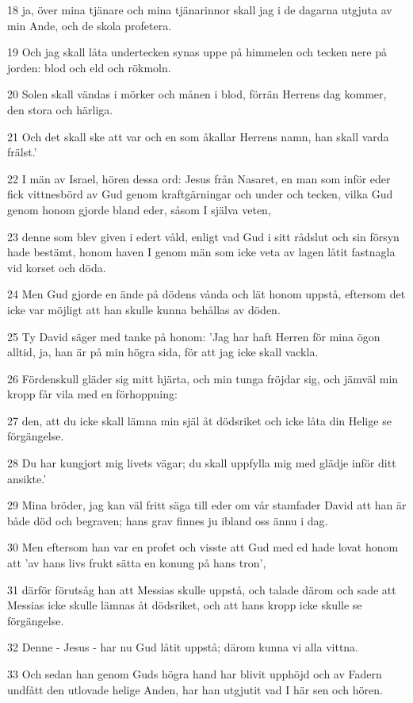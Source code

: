 \par 18 ja, över mina tjänare och mina tjänarinnor skall jag i de dagarna utgjuta av min Ande, och de skola profetera.
\par 19 Och jag skall låta undertecken synas uppe på himmelen och tecken nere på jorden: blod och eld och rökmoln.
\par 20 Solen skall vändas i mörker och månen i blod, förrän Herrens dag kommer, den stora och härliga.
\par 21 Och det skall ske att var och en som åkallar Herrens namn, han skall varda frälst.'
\par 22 I män av Israel, hören dessa ord: Jesus från Nasaret, en man som inför eder fick vittnesbörd av Gud genom kraftgärningar och under och tecken, vilka Gud genom honom gjorde bland eder, såsom I själva veten,
\par 23 denne som blev given i edert våld, enligt vad Gud i sitt rådslut och sin försyn hade bestämt, honom haven I genom män som icke veta av lagen låtit fastnagla vid korset och döda.
\par 24 Men Gud gjorde en ände på dödens vånda och lät honom uppstå, eftersom det icke var möjligt att han skulle kunna behållas av döden.
\par 25 Ty David säger med tanke på honom: 'Jag har haft Herren för mina ögon alltid, ja, han är på min högra sida, för att jag icke skall vackla.
\par 26 Fördenskull gläder sig mitt hjärta, och min tunga fröjdar sig, och jämväl min kropp får vila med en förhoppning:
\par 27 den, att du icke skall lämna min själ åt dödsriket och icke låta din Helige se förgängelse.
\par 28 Du har kungjort mig livets vägar; du skall uppfylla mig med glädje inför ditt ansikte.'
\par 29 Mina bröder, jag kan väl fritt säga till eder om vår stamfader David att han är både död och begraven; hans grav finnes ju ibland oss ännu i dag.
\par 30 Men eftersom han var en profet och visste att Gud med ed hade lovat honom att 'av hans livs frukt sätta en konung på hans tron',
\par 31 därför förutsåg han att Messias skulle uppstå, och talade därom och sade att Messias icke skulle lämnas åt dödsriket, och att hans kropp icke skulle se förgängelse.
\par 32 Denne - Jesus - har nu Gud låtit uppstå; därom kunna vi alla vittna.
\par 33 Och sedan han genom Guds högra hand har blivit upphöjd och av Fadern undfått den utlovade helige Anden, har han utgjutit vad I här sen och hören.
